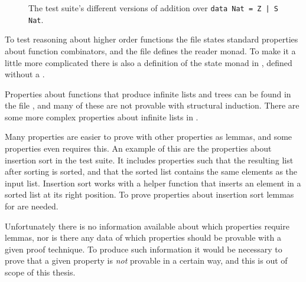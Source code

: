 \begin{figure}[h!]
\centering
{}\hspace{10pt}
\hspace{10pt}

\hspace{10pt}
\hspace{10pt}

\hspace{10pt}
\hspace{10pt}
\caption{The test suite's different versions of addition over \texttt{data Nat = Z | S Nat}.
\label{code:natadd}
}
\end{figure}

To test reasoning about higher order functions the file 
states standard properties about function combinators, and the file
 defines the reader monad. To make it a little more
complicated there is also a definition of the state monad in
, defined without a .

Properties about functions that produce infinite lists and trees can
be found in the file , and many of these are not provable
with structural induction. There are some more complex properties
about infinite lists in .

Many properties are easier to prove with other properties as lemmas,
and some properties even requires this. An example of this are the
properties about insertion sort in the test suite. It includes
properties such that the resulting list after sorting is sorted, and
that the sorted list contains the same elements as the input
list. Insertion sort works with a helper function  that
inserts an element in a sorted list at its right position. To prove
properties about insertion sort lemmas for  are needed.

Unfortunately there is no information available about which properties
require lemmas, nor is there any data of which properties should be
provable with a given proof technique. To produce such information it
would be necessary to prove that a given property is \emph{not}
provable in a certain way, and this is out of scope of this thesis.


